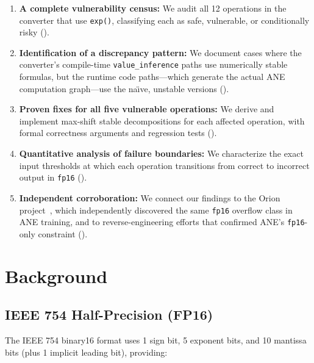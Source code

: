 \documentclass[10pt,twocolumn]{article}
\newcommand{\fp}{\texttt{fp16}}
\newcommand{\ane}{ANE}
\newcommand{\expop}{\texttt{exp()}}
\begin{document}
\begin{enumerate}[leftmargin=*,itemsep=2pt]
  \item \textbf{A complete vulnerability census:} We audit all 12
    operations in the converter that use \expop{}, classifying each
    as safe, vulnerable, or conditionally risky
    ().

  \item \textbf{Identification of a discrepancy pattern:} We
    document cases where the converter's compile-time
    \texttt{value\_inference} paths use numerically stable formulas,
    but the runtime code paths---which generate the actual \ane{}
    computation graph---use the na\"{\i}ve, unstable versions
    ().

  \item \textbf{Proven fixes for all five vulnerable operations:}
    We derive and implement max-shift stable decompositions for
    each affected operation, with formal correctness arguments and
    regression tests ().

  \item \textbf{Quantitative analysis of failure boundaries:} We
    characterize the exact input thresholds at which each operation
    transitions from correct to incorrect output in \fp{}
    ().

  \item \textbf{Independent corroboration:} We connect our findings
    to the Orion project~\citep{kumaresan2026orion}, which
    independently discovered the same \fp{} overflow class in \ane{}
    training, and to reverse-engineering efforts that confirmed
    \ane{}'s \fp{}-only constraint ().
\end{enumerate}

\section{Background}
\label{sec:background}

\subsection{IEEE 754 Half-Precision (FP16)}
\label{sec:fp16}

The IEEE 754 binary16 format uses 1 sign bit, 5 exponent bits, and
10 mantissa bits (plus 1 implicit leading bit), providing:
\end{document}
